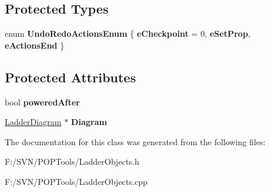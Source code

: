 \subsection*{Protected Types}
\begin{DoxyCompactItemize}
\item 
enum {\bfseries Undo\-Redo\-Actions\-Enum} \{ {\bfseries e\-Checkpoint} = 0, 
{\bfseries e\-Set\-Prop}, 
{\bfseries e\-Actions\-End}
 \}
\end{DoxyCompactItemize}
\subsection*{Protected Attributes}
\begin{DoxyCompactItemize}
\item 
\hypertarget{class_ladder_elem_a8ad6b449a2fe3b72e5ed4339ee18a1a4}{bool {\bfseries powered\-After}}\label{class_ladder_elem_a8ad6b449a2fe3b72e5ed4339ee18a1a4}

\item 
\hypertarget{class_ladder_elem_a12087129f76e7020d1f85750766c9647}{\hyperlink{class_ladder_diagram}{Ladder\-Diagram} $\ast$ {\bfseries Diagram}}\label{class_ladder_elem_a12087129f76e7020d1f85750766c9647}

\end{DoxyCompactItemize}


The documentation for this class was generated from the following files\-:\begin{DoxyCompactItemize}
\item 
F\-:/\-S\-V\-N/\-P\-O\-P\-Tools/Ladder\-Objects.\-h\item 
F\-:/\-S\-V\-N/\-P\-O\-P\-Tools/Ladder\-Objects.\-cpp\end{DoxyCompactItemize}
